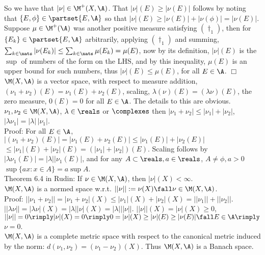 \noindent
So we have that $|\nu| \in \M^+(X, \A)$. That $|\nu|(E) \ge |\nu(E)|$ follows by noting that $ \{ E, \phi \} \in \partset{E,\A}$ so that $|\nu|(E) \ge |\nu(E)| + |\nu(\phi)| = |\nu(E)|$. Suppose $\mu \in \M^+(\A)$ was another positive measure satisfying ${(\dagger_1)}$, then for $\{ E_k \} \in \partset{E,\A}$ arbitrarily, applying ${(\dagger_1)}$ and summing, $\sum_{k \in \nats} |\nu(E_k)| \le \sum_{k \in \nats} \mu(E_k) = \mu(E)$, now by its definition, $|\nu|(E)$ is the $\sup$ of numbers of the form on the LHS, and by this inequality, $\mu(E)$ is an upper bound for such numbers, thus $|\nu|(E) \le \mu(E)$, for all $E \in \A$.  $\Box$ \\

$\M(X, \A)$ is a vector space, with respect to measure addition, $(\nu_1 + \nu_2)(E) = \nu_1(E) + \nu_2(E)$, scaling, $\lambda(\nu)(E) = (\lambda \nu)(E)$, the zero measure, $0(E) = 0$ for all $E \in \A$. The details to this are obvious.\\

$\nu_1, \nu_2 \in \M(X, \A)$, $\lambda \in \reals$ or $\complexes$ then $|\nu_1 + \nu_2| \le |\nu_1| + |\nu_2|$, $|\lambda \nu_1| = |\lambda| \, |\nu_1|$. \\

\noindent
Proof: For all $E \in \A$, $|(\nu_1 + \nu_2)(E)| = |\nu_1(E) + \nu_2(E)| \le |\nu_1(E)| + |\nu_2(E)|$ 
$\le |\nu_1|(E) + |\nu_2|(E) = (|\nu_1| + |\nu_2|)(E)$. Scaling follows by $|\lambda \nu_1(E)| = |\lambda| |\nu_1(E)|$, and for any $A \subset \reals, a \in \reals$, $A \not = \phi, a > 0$   $\sup \{ a x: x \in A \} = a \sup A$.\\


Theorem 6.4 in Rudin: If $\nu \in \M(X, \A)$, then $|\nu|(X) < \infty$. \\

$\M(X, \A)$ is a normed space w.r.t. $||\nu|| := \nu(X) \fall \nu \in \M(X, \A)$. \\

\noindent
Proof: $|| \nu_1 + \nu_2 || = |\nu_1 + \nu_2|(X) \le |\nu_1|(X) + |\nu_2|(X) = ||\nu_1|| + ||\nu_2|| $. $||\lambda \nu|| = |\lambda \nu|(X) = |\lambda| |\nu|(X) = |\lambda| ||\nu||$. $||\nu||(X) = |\nu|(X) \ge 0$, $||\nu|| = 0 \rimply |\nu|(X) = 0 \rimply 0 = |\nu|(X) \ge |\nu|(E) \ge |\nu(E)| \fall E \in \A \rimply$ $\nu = 0$. \\

$\M(X, \A)$ is a complete metric space with respect to the canonical metric induced by the norm: $d(\nu_1,\nu_2) = (\nu_1-\nu_2)(X)$. Thus $\M(X, \A)$ is a Banach space. \\

